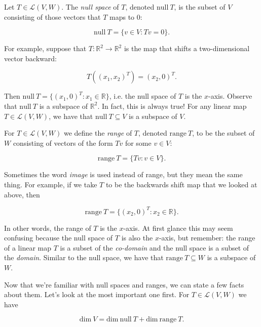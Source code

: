 \documentclass[12pt]{article}
\begin{document}
Let $T \in \mathcal{L} (V, W)$. The \textit{null space} of $T$, denoted $\textrm{null} \: T$, is the subset of $V$ consisting of those vectors that $T$ maps to 0:

$$\textrm{null} \: T = \{ v \in V : Tv = 0 \}.$$

For example, suppose that $T : \mathbb{R}^2 \rightarrow \mathbb{R}^2$ is the map that shifts a two-dimensional vector backward:

$$T( (x_1, x_2)^T ) = (x_2, 0)^T.$$

Then $\textrm{null} \: T = \{ (x_1, 0)^T : x_1 \in \mathbb{R} \}$, i.e. the null space of $T$ is the $x$-axis. Observe that $\textrm{null} \: T$ is a subspace of $\mathbb{R}^2$. In fact, this is always true! For any linear map $T \in \mathcal{L} (V, W)$, we have that $\textrm{null} \: T \subseteq V$ is a subspace of $V$.

\vskip 3mm

For $T \in \mathcal{L} (V, W)$ we define the \textit{range} of $T$, denoted $\textrm{range} \: T$, to be the subset of $W$ consisting of vectors of the form $Tv$ for some $v \in V$:

$$\textrm{range} \: T = \{ Tv : v \in V \}.$$

Sometimes the word \textit{image} is used instead of range, but they mean the same thing. For example, if we take $T$ to be the backwards shift map that we looked at above, then

$$\textrm{range} \: T = \{ (x_2, 0)^T : x_2 \in \mathbb{R} \}.$$

In other words, the range of $T$ is the $x$-axis. At first glance this may seem confusing because the null space of $T$ is also the $x$-axis, but remember:  the range of a linear map $T$ is a subset of the \textit{co-domain} and the null space is a subset of the \textit{domain}. Similar to the null space, we have that $\textrm{range} \: T \subseteq W$ is a subspace of $W$.

\vskip 4mm
Now that we're familiar with null spaces and ranges, we can state a few facts about them. Let's look at the most important one first. For $T \in \mathcal{L} (V, W)$ we have

$$\textrm{dim} \: V = \textrm{dim} \: \textrm{null} \: T + \textrm{dim} \: \textrm{range} \: T.$$
\end{document}
